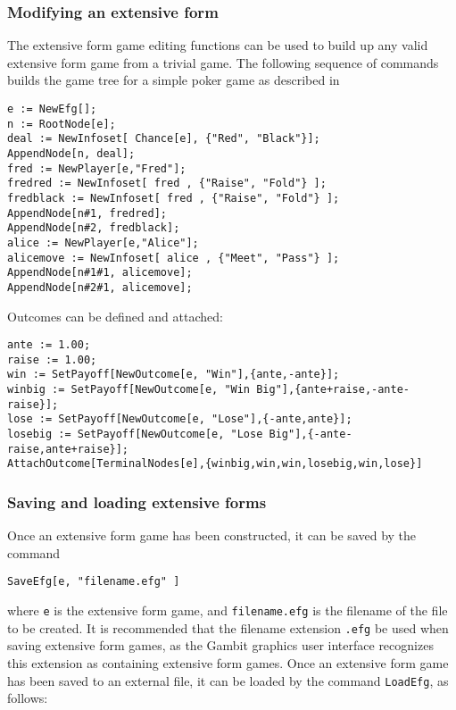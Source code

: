 \subsubsection{Modifying an extensive form}

The extensive form game editing functions can be used to build up any
valid extensive form game from a trivial game.  The following sequence
of commands builds the game tree for a simple poker game as described
in \cite{Mye:91}

\begin{verbatim}
e := NewEfg[];
n := RootNode[e];
deal := NewInfoset[ Chance[e], {"Red", "Black"}];
AppendNode[n, deal];
fred := NewPlayer[e,"Fred"];
fredred := NewInfoset[ fred , {"Raise", "Fold"} ];
fredblack := NewInfoset[ fred , {"Raise", "Fold"} ];
AppendNode[n#1, fredred];
AppendNode[n#2, fredblack];
alice := NewPlayer[e,"Alice"];
alicemove := NewInfoset[ alice , {"Meet", "Pass"} ];
AppendNode[n#1#1, alicemove]; 
AppendNode[n#2#1, alicemove]; 
\end{verbatim}

\noindent Outcomes can be defined and attached:

\begin{verbatim}
ante := 1.00;
raise := 1.00;
win := SetPayoff[NewOutcome[e, "Win"],{ante,-ante}];
winbig := SetPayoff[NewOutcome[e, "Win Big"],{ante+raise,-ante-raise}];
lose := SetPayoff[NewOutcome[e, "Lose"],{-ante,ante}];
losebig := SetPayoff[NewOutcome[e, "Lose Big"],{-ante-raise,ante+raise}];
AttachOutcome[TerminalNodes[e],{winbig,win,win,losebig,win,lose}]
\end{verbatim}

\subsubsection{Saving and loading extensive forms}

Once an extensive form game has been constructed, it can be saved by
the command 

\begin{verbatim}
SaveEfg[e, "filename.efg" ]
\end{verbatim}

\noindent where \verb+e+ is the extensive form game, and \verb+filename.efg+ is
the filename of the file to be created.  It is recommended that the
filename extension \verb+.efg+ be used when saving extensive form
games, as the Gambit graphics user interface recognizes this extension
as containing extensive form games.  Once an extensive form game has
been saved to an external file, it can be loaded by the command
\verb+LoadEfg+, as follows:

